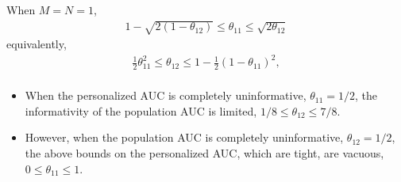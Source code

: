 \documentclass{beamer}
\newcommand{\cind}{\perp \!\!\! \perp}
\newcommand{\aucindiv}{\theta_{11}}%
\newcommand{\aucpop}{\theta_{12}}%
\begin{document}

\begin{frame}
When $M=N=1$,
\begin{align}
  1-\sqrt{2(1-\aucpop)} \le \aucindiv \le \sqrt{2\aucpop}
\end{align}
 equivalently,
\begin{align}
  \frac{1}{2}\aucindiv^2 \le \aucpop \le 1 - \frac{1}{2}(1-\aucindiv)^2,\\
\end{align}

\begin{itemize}
\item When the personalized AUC is completely uninformative, $\aucindiv=1/2$,
the informativity of the population AUC is limited,
$1/8 \le \aucpop \le 7/8$.
\item However, when the population AUC is
  completely uninformative, $\aucpop=1/2$, the above bounds on the personalized AUC, which are tight, are vacuous, $0\le\aucindiv\le 1$.
\end{itemize}
\end{frame}
\end{document}
